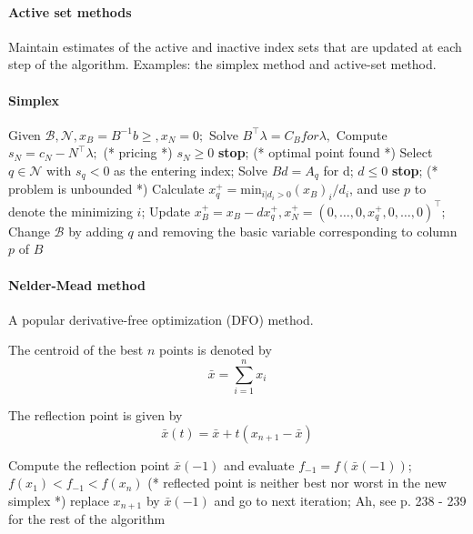 
\paragraph{Active set methods} Maintain estimates of the active and inactive index sets
that are updated at each step of the algorithm. Examples: the simplex method and active-set method.

\paragraph{Simplex}

\begin{codebox}
\li Given $\mathcal{B}, \mathcal{N}, x_B = B^{-1}b \geq, x_N = 0;$
\li Solve $B^\top \lambda = C_B for \lambda,$
\li Compute $s_N = c_N - N^\top \lambda;$ (* pricing *)
\li \If $s_N \geq 0$ \Indentmore
\li \textbf{stop}; (* optimal point found *) \End
\li Select $q \in \mathcal{N}$ with $s_q < 0$ as the entering index;
\li Solve $Bd = A_q$ for d;
\li \If $d \leq 0$ \Indentmore
\li \textbf{stop}; (* problem is unbounded *) \End
\li Calculate $x_q^+ = \text{min}_{i | d_i > 0} (x_B)_i/d_i$, and use $p$ to
\zi denote the minimizing $i$;
\li Update $x_B^+ = x_B - dx_q^+, x_N^+ = (0, \dots, 0, x_q^+, 0, \dots, 0)^\top$;
\li Change $\mathcal{B}$ by adding $q$ and removing the basic
\zi variable corresponding to column $p$ of $B$
\end{codebox}

\paragraph{Nelder-Mead method} A popular derivative-free optimization (DFO) method.

The centroid of the best $n$ points is denoted by
%
\begin{equation}
    \bar{x} = \sum_{i=1}^n x_i
\end{equation}

The reflection point is given by
%
\begin{equation}
    \bar{x}(t) = \bar{x} + t(x_{n+1} - \bar{x})
\end{equation}

\begin{codebox}
\li Compute the reflection point $\bar{x}(-1)$
\zi and evaluate $f_{-1} = f(\bar{x}(-1))$;
\li \If $f(x_1) < f_{-1} < f(x_n) $ \Indentmore
\li (* reflected point is neither best
\zi nor worst in the new simplex *)
\zi replace $x_{n+1}$ by $\bar{x}(-1)$ and go to next iteration; \End
\li Ah, see p. 238 - 239 for the rest of the algorithm
\end{codebox}

